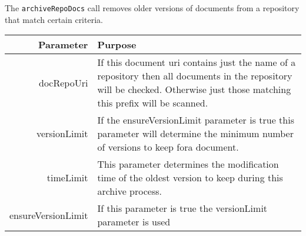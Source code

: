 The \verb+archiveRepoDocs+ call removes older versions of documents from a
repository that match certain criteria.

\begin{table}[h]
\begin{center}
\begin{tabular}{r p{8cm}}
  Parameter & Purpose \\
  \hline
  docRepoUri & If this document uri contains just the name of a repository then all
  documents in the repository will be checked. Otherwise just those matching this prefix will be
  scanned. \\
  versionLimit & If the ensureVersionLimit parameter is true this parameter will determine
  the minimum number of versions to keep fora document. \\
  timeLimit & This parameter determines the modification time of the oldest version to keep during this
  archive process. \\
  ensureVersionLimit & If this parameter is true the versionLimit parameter is used \\
\end{tabular}
\end{center}
\end{table}
